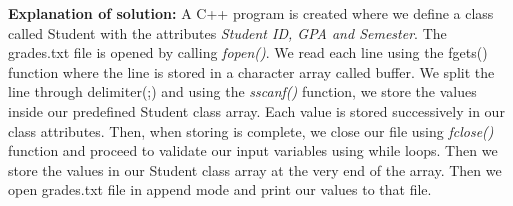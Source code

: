 \documentclass[a4paper, left=1in, right=1in,12pt]{article}
\begin{document}
\textbf{Explanation of solution: }A C++ program is created where we define a class called Student with the attributes \textit{Student ID, GPA and Semester}. The grades.txt file is opened by calling \textit{fopen()}. We read each line using the fgets() function where the line is stored in a character array called buffer. We split the line through delimiter(;)  and using the \textit{sscanf()} function, we store the values inside our predefined Student class array. Each value is stored successively in our class attributes.
Then, when storing is complete, we close our file using \textit{fclose()} function and proceed to validate our input variables using while loops. Then we store the values in our Student class array at the very end of the array. Then we open grades.txt file in append mode and print our values to that file.
\end{document}
